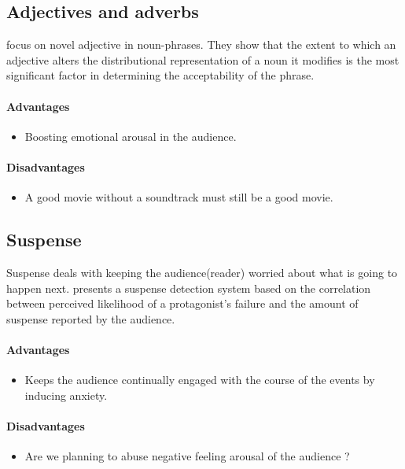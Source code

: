 \documentclass{article}
\begin{document}
			\subsection{Adjectives and adverbs}
			\citet{vecchi-2016-spicy-adjectives-and-nominal-donkeys-capturing-semantic-deviance-using-compositionality-in-distributional-spaces} focus on novel adjective in noun-phrases. They show that the extent to which an adjective alters the distributional representation of a noun it modifies is the most significant factor in determining the acceptability of the phrase.
				\paragraph{Advantages}
					\begin{itemize}
						\item Boosting emotional arousal in the audience. 
					\end{itemize}
				\paragraph{Disadvantages}
					\begin{itemize}
						\item A good movie without a soundtrack must still be a good movie.    
					\end{itemize}
			\subsection{Suspense}
			Suspense deals with keeping the audience(reader) worried about what is going to happen next. \citet{oneill-2011-toward-a-computational-framework-of-suspense-and-dramatic-arc} presents a suspense detection system based on the correlation between perceived likelihood of a protagonist’s failure and the amount of suspense reported by the audience.
				\paragraph{Advantages}
					\begin{itemize}
						\item Keeps the audience continually engaged with the course of the events by inducing anxiety.  
					\end{itemize}
				\paragraph{Disadvantages}
					\begin{itemize}
						\item Are we planning to abuse negative feeling arousal of the audience ?  
					\end{itemize}
\end{document}
